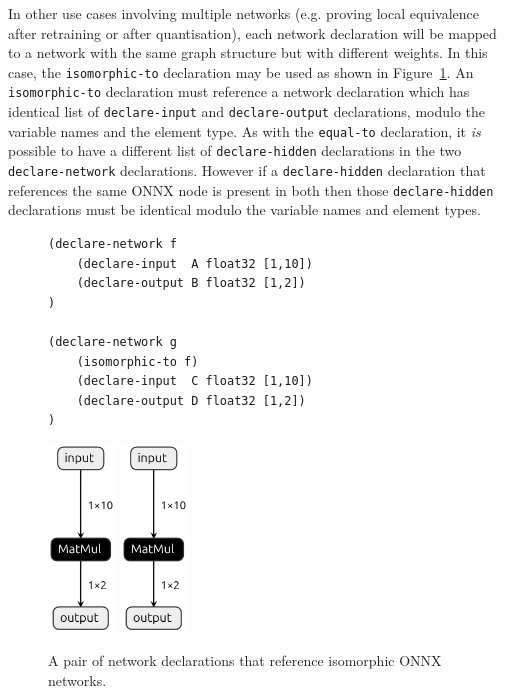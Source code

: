 In other use cases involving multiple networks (e.g. proving local equivalence after retraining or after quantisation), each network declaration will be mapped to a network with the same graph structure but with different weights. In this case, the \texttt{isomorphic-to} declaration may be used as shown in Figure~\ref{fig:multiple-isomorphic-networks}. An \texttt{isomorphic-to} declaration must reference a network declaration which has identical list of \texttt{declare-input} and \texttt{declare-output} declarations, modulo the variable names and the element type. As with the \texttt{equal-to} declaration, it \emph{is} possible to have a different list of \texttt{declare-hidden} declarations in the two \texttt{declare-network} declarations. However if a \texttt{declare-hidden} declaration that references the same ONNX node is present in both then those \texttt{declare-hidden} declarations must be identical modulo the variable names and element types.

\begin{figure}[h!]
    \begin{minipage}[c]{0.64\textwidth}
        \begin{lstlisting}[style=lbnf]
(declare-network f
    (declare-input  A float32 [1,10])
    (declare-output B float32 [1,2])
)

(declare-network g
    (isomorphic-to f)
    (declare-input  C float32 [1,10])
    (declare-output D float32 [1,2])
)\end{lstlisting}
    \end{minipage}
    \begin{minipage}[c]{0.35\textwidth}
        \centering
        \includegraphics[height=5cm]{imgs/simple_net.onnx.png}
        \vspace{0.5cm} 
        \includegraphics[height=5cm]{imgs/simple_net.onnx.png}
    \end{minipage}
    \caption{A pair of \vnnlib{} network declarations that reference isomorphic ONNX networks.}
    \label{fig:multiple-isomorphic-networks}
\end{figure}

